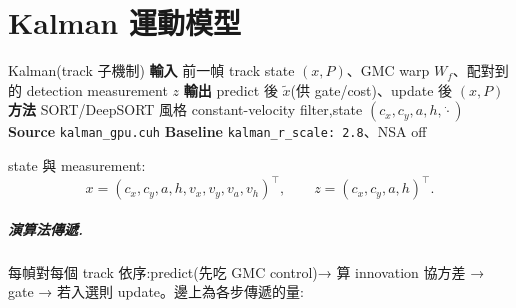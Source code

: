 \chapter{Kalman 運動模型}\label{ch:kalman}

\begin{center}\end{center}

\begin{contract}{Kalman(track 子機制)}
\textbf{輸入}\; 前一幀 track state \((x,P)\)、GMC warp \(W_f\)、配對到的 detection
measurement \(z\)\quad
\textbf{輸出}\; predict 後 \(\tilde{x}\)(供 gate/cost)、update 後 \((x,P)\)\\
\textbf{方法}\; SORT/DeepSORT 風格 constant-velocity filter,state
\((c_x,c_y,a,h,\dot{\cdot})\)\quad
\textbf{Source}\; \texttt{kalman\_gpu.cuh}\quad
\textbf{Baseline}\; \texttt{kalman\_r\_scale: 2.8}、NSA off
\end{contract}

\noindent
state 與 measurement:
\begin{equation}\label{eq:kf-state}
  x=(c_x,c_y,a,h,v_x,v_y,v_a,v_h)^{\!\top},\qquad
  z=(c_x,c_y,a,h)^{\!\top}.
\end{equation}

\paragraph{演算法傳遞.} 每幀對每個 track 依序:predict(先吃 GMC control)→ 算
innovation 協方差 → gate → 若入選則 update。邊上為各步傳遞的量:

\begin{center}\end{center}

